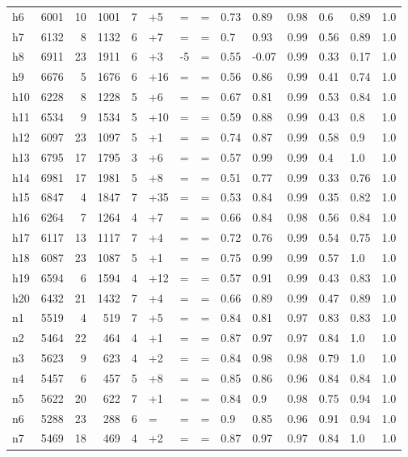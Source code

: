 \begin{tabular}{lrrrllllllllll}
h6 & 6001 & 10 & 1001 & 7 & +5 & = & = & 0.73 & 0.89 & 0.98 & 0.6 & 0.89 & 1.0 \\
h7 & 6132 & 8 & 1132 & 6 & +7 & = & = & 0.7 & 0.93 & 0.99 & 0.56 & 0.89 & 1.0 \\
h8 & 6911 & 23 & 1911 & 6 & +3 & -5 & = & 0.55 & -0.07 & 0.99 & 0.33 & 0.17 & 1.0 \\
h9 & 6676 & 5 & 1676 & 6 & +16 & = & = & 0.56 & 0.86 & 0.99 & 0.41 & 0.74 & 1.0 \\
h10 & 6228 & 8 & 1228 & 5 & +6 & = & = & 0.67 & 0.81 & 0.99 & 0.53 & 0.84 & 1.0 \\
h11 & 6534 & 9 & 1534 & 5 & +10 & = & = & 0.59 & 0.88 & 0.99 & 0.43 & 0.8 & 1.0 \\
h12 & 6097 & 23 & 1097 & 5 & +1 & = & = & 0.74 & 0.87 & 0.99 & 0.58 & 0.9 & 1.0 \\
h13 & 6795 & 17 & 1795 & 3 & +6 & = & = & 0.57 & 0.99 & 0.99 & 0.4 & 1.0 & 1.0 \\
h14 & 6981 & 17 & 1981 & 5 & +8 & = & = & 0.51 & 0.77 & 0.99 & 0.33 & 0.76 & 1.0 \\
h15 & 6847 & 4 & 1847 & 7 & +35 & = & = & 0.53 & 0.84 & 0.99 & 0.35 & 0.82 & 1.0 \\
h16 & 6264 & 7 & 1264 & 4 & +7 & = & = & 0.66 & 0.84 & 0.98 & 0.56 & 0.84 & 1.0 \\
h17 & 6117 & 13 & 1117 & 7 & +4 & = & = & 0.72 & 0.76 & 0.99 & 0.54 & 0.75 & 1.0 \\
h18 & 6087 & 23 & 1087 & 5 & +1 & = & = & 0.75 & 0.99 & 0.99 & 0.57 & 1.0 & 1.0 \\
h19 & 6594 & 6 & 1594 & 4 & +12 & = & = & 0.57 & 0.91 & 0.99 & 0.43 & 0.83 & 1.0 \\
h20 & 6432 & 21 & 1432 & 7 & +4 & = & = & 0.66 & 0.89 & 0.99 & 0.47 & 0.89 & 1.0 \\
n1 & 5519 & 4 & 519 & 7 & +5 & = & = & 0.84 & 0.81 & 0.97 & 0.83 & 0.83 & 1.0 \\
n2 & 5464 & 22 & 464 & 4 & +1 & = & = & 0.87 & 0.97 & 0.97 & 0.84 & 1.0 & 1.0 \\
n3 & 5623 & 9 & 623 & 4 & +2 & = & = & 0.84 & 0.98 & 0.98 & 0.79 & 1.0 & 1.0 \\
n4 & 5457 & 6 & 457 & 5 & +8 & = & = & 0.85 & 0.86 & 0.96 & 0.84 & 0.84 & 1.0 \\
n5 & 5622 & 20 & 622 & 7 & +1 & = & = & 0.84 & 0.9 & 0.98 & 0.75 & 0.94 & 1.0 \\
n6 & 5288 & 23 & 288 & 6 & = & = & = & 0.9 & 0.85 & 0.96 & 0.91 & 0.94 & 1.0 \\
n7 & 5469 & 18 & 469 & 4 & +2 & = & = & 0.87 & 0.97 & 0.97 & 0.84 & 1.0 & 1.0 \\

\end{tabular}
